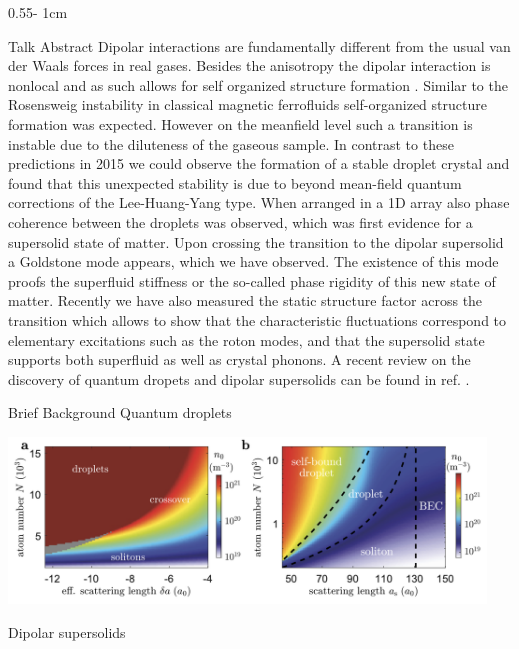 \documentclass{../psuposter}
\begin{document}
\begin{frame}
\begin{columns}[t, totalwidth=\textwidth]
\begin{column}{0.55\textwidth - 1cm}
    \begin{block}{Talk Abstract}
         Dipolar interactions are fundamentally different from the usual van der Waals forces in real gases. Besides the anisotropy the dipolar interaction is nonlocal and as such allows for self organized structure formation \cite{lahayePhysicsDipolarBosonic2009a}. Similar to the Rosensweig instability in classical magnetic ferrofluids self-organized structure formation was expected. However on the meanfield level such a transition is instable due to the diluteness of the gaseous sample. In contrast to these predictions in 2015 we could observe the formation of a stable droplet crystal and found that this unexpected stability is due to beyond mean-field quantum corrections of the Lee-Huang-Yang type. When arranged in a 1D array also phase coherence between the droplets was observed, which was first evidence for a supersolid state of matter. Upon crossing the transition to the dipolar supersolid a Goldstone mode appears, which we have observed. The existence of this mode proofs the superfluid stiffness or the so-called phase rigidity of this new state of matter. Recently we have also measured the static structure factor across the transition which allows to show that the characteristic fluctuations correspond to elementary excitations such as the roton modes, and that the supersolid state supports both superfluid as well as crystal phonons. A recent review on the discovery of quantum dropets and dipolar supersolids can be found in ref. \cite{bottcherTransientSupersolidProperties2019a}.
    \end{block}


    \begin{block}{Brief Background}
        Quantum droplets \cite{lahayePhysicsDipolarBosonic2009a} 

        \begin{center}
		   	\includegraphics[width=0.95\textwidth]{images/droplet}    		
    	\end{center}
		 Dipolar supersolids \cite{bottcherNewStatesMatter2020} 


\end{block}
\end{column}
\end{columns}
\end{frame}
\end{document}
